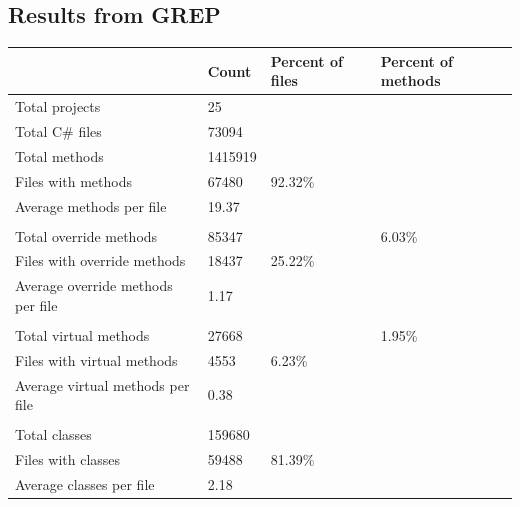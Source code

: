 {\subsection{Results from GREP}
\begin{center}
	\label{CsResults}
	\begin{tabular}{|l|l|l|l|}
		\hline
		& Count   & Percent of files & Percent of methods \\ \hline
		Total projects                       & 25      &                  &                    \\ \hline
		Total C\# files                      & 73094   &                  &                    \\ \hline
		Total methods                        & 1415919 &                  &                    \\ \hline
		Files with methods                   & 67480   & 92.32\%          &                    \\ \hline
		Average methods per file             & 19.37   &                  &                    \\ \hline
		&         &                  &                    \\ \hline
		Total override methods               & 85347   &                  & 6.03\%             \\ \hline
		Files with override methods          & 18437   & 25.22\%          &                    \\ \hline
		Average override methods per file    & 1.17    &                  &                    \\ \hline
		&         &                  &                    \\ \hline
		Total virtual methods                & 27668   &                  & 1.95\%             \\ \hline
		Files with virtual methods           & 4553    & 6.23\%           &                    \\ \hline
		Average virtual methods per file     & 0.38    &                  &                    \\ \hline
		&         &                  &                    \\ \hline
		Total classes                        & 159680  &                  &                    \\ \hline
		Files with classes                   & 59488   & 81.39\%          &                    \\ \hline
		Average classes per file             & 2.18    &                  &                    \\ \hline

\end{tabular}
\end{center}}

